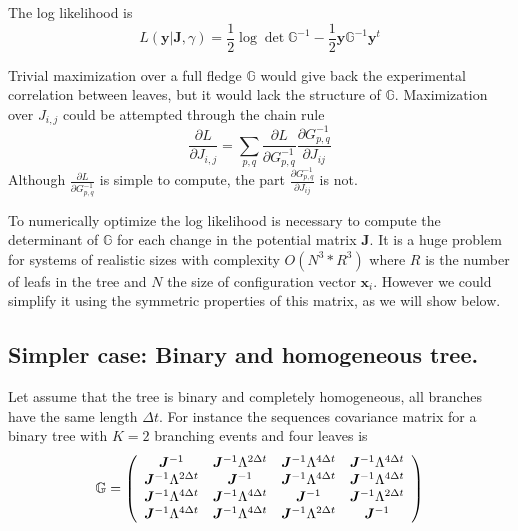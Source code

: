 \documentclass[reprint,amsmath,amssymb,superscriptaddress,showpacs,pre]{revtex4-1}
\let\originalleft\left
\let\originalright\right
\renewcommand{\left}{\mathopen{}\mathclose\bgroup\originalleft}
\renewcommand{\right}{\aftergroup\egroup\originalright}
\begin{document}
The log likelihood is
\begin{equation}\label{eq:log_likelihood}
L(\mathbf{y}|\bm J,\gamma) = \frac 1 2 \log \det  \mathbb{G}^{-1}  -\frac 1 2 \mathbf{y}\mathbb{G}^{-1} \mathbf{y}^t
\end{equation}

Trivial maximization over a full fledge $\mathbb{G}$ would give back the experimental correlation between leaves, but it would lack the structure of $\mathbb{G}$. Maximization over $J_{i,j}$ could be attempted through the chain rule
\[  \frac{\partial L}{\partial J_{i,j}} = \sum_{p,q}\frac{\partial L}{\partial G^{-1}_{p,q}} \frac{\partial G^{-1}_{p,q}}{\partial J_{ij}} \]
Although $\frac{\partial L}{\partial G^{-1}_{p,q}}$ is simple to compute, the part $ \frac{\partial G^{-1}_{p,q}}{\partial J_{ij}}$ is not.

To numerically optimize the log likelihood is necessary   to compute  the determinant of  $\mathbb{G}$   for each change in the potential matrix $\bm{J}$.  It is a huge problem for systems of realistic sizes with complexity $O(N^3*R^3)$ where $R$ is the number of leafs in the tree and $N$ the size of configuration vector  $\mathbf{x}_i$. However we could simplify it  using the symmetric properties of  this matrix, as we will show below.
\subsection{Simpler case: Binary and homogeneous tree.}
Let assume that the tree is binary and completely homogeneous, all branches have the same length $\Delta t$. For instance the sequences covariance matrix for a binary tree with $K=2$ branching events and four leaves is
\begin{equation} 
\mathbb{G} =  \left(
\begin{array}{cccc}
{ \bm J^{-1}} & {\bm J^{-1}} \Lambda ^{2\Delta t} & {\bm J^{-1}} \Lambda ^{4\Delta t} & {\bm J^{-1}} \Lambda ^{4\Delta t} \\
{\bm J^{-1}} \Lambda ^{2\Delta t} & {\bm J^{-1}} & {\bm J^{-1}} \Lambda ^{4\Delta t} & {\bm J^{-1}} \Lambda ^{4\Delta t} \\
{\bm J^{-1}} \Lambda ^{4\Delta t} & {\bm J^{-1}} \Lambda ^{4\Delta t} & {\bm J^{-1}} & {\bm J^{-1}} \Lambda ^{2\Delta t} \\
{\bm J^{-1}} \Lambda ^{4\Delta t} & {\bm J^{-1}} \Lambda ^{4\Delta t} & {\bm J^{-1}} \Lambda ^{2\Delta t} & {\bm J^{-1}} \\
\end{array}\label{eq:CL}
\right)
\end{equation}
\end{document}
